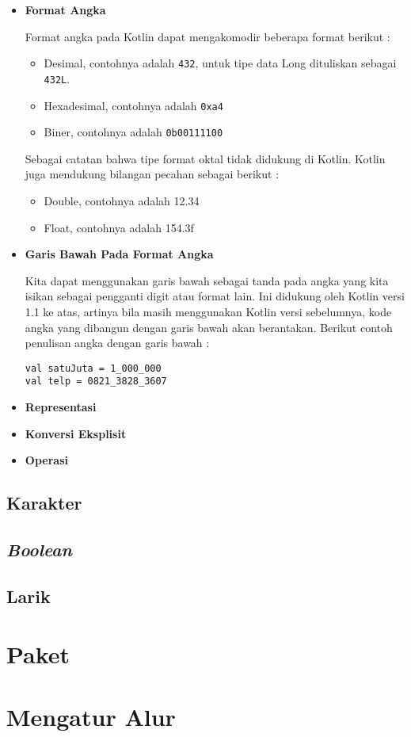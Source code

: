 \begin{itemize}
	\item \textbf{Format Angka}
	
	Format angka pada Kotlin dapat mengakomodir beberapa format berikut :
	
	\begin{itemize}
		\item Desimal, contohnya adalah \texttt{432}, untuk tipe data Long dituliskan sebagai \texttt{432L}.
		\item Hexadesimal, contohnya adalah \texttt{0xa4}
		\item Biner, contohnya adalah \texttt{0b00111100}
	\end{itemize}
	
	Sebagai catatan bahwa tipe format oktal tidak didukung di Kotlin. Kotlin juga mendukung bilangan pecahan sebagai berikut :
	
	\begin{itemize}
		\item Double, contohnya adalah 12.34
		\item Float, contohnya adalah 154.3f
	\end{itemize}
	
	\item \textbf{Garis Bawah Pada Format Angka}
	
	Kita dapat menggunakan garis bawah sebagai tanda pada angka yang kita isikan sebagai pengganti digit atau format lain. Ini didukung oleh Kotlin versi 1.1 ke atas, artinya bila masih menggunakan Kotlin versi sebelumnya, kode angka yang dibangun dengan garis bawah akan berantakan. Berikut contoh penulisan angka dengan garis bawah :
	
	\begin{lstlisting}
val satuJuta = 1_000_000
val telp = 0821_3828_3607
	\end{lstlisting}
		
	
	\item \textbf{Representasi}
	
	
	
	\item \textbf{Konversi Eksplisit}
	\item \textbf{Operasi}
\end{itemize}

\subsection{Karakter}

\subsection{\textit{Boolean}}

\subsection{Larik}


\section{Paket}

\section{Mengatur Alur}

